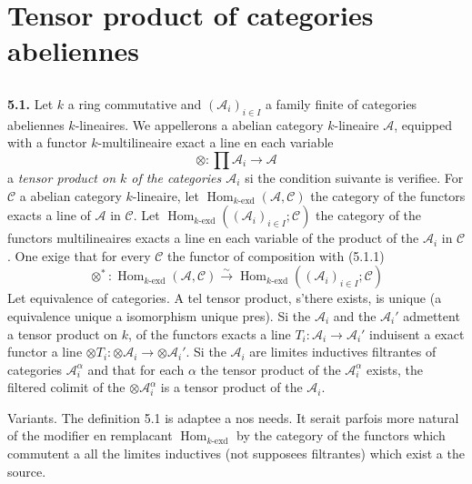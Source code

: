 \documentclass[12pt,a4paper]{article}
\theoremstyle{plain}
\theoremstyle{definition}
\theoremstyle{remark}
\DeclareMathOperator{\Hom}{Hom}
\begin{document}
\section{Tensor product of categories abeliennes}

\subsection{}

\textbf{5.1.} Let $k$ a ring commutative and $(\mathcal{A}_i)_{i \in I}$ a family finite of categories abeliennes $k$-lineaires. We appellerons a abelian category $k$-lineaire $\mathcal{A}$, equipped with a functor $k$-multilineaire exact a line en each variable
\begin{equation}\label{eq:5.1.1}
\otimes : \prod \mathcal{A}_i \to \mathcal{A}
\end{equation}
a \emph{tensor product on $k$ of the categories $\mathcal{A}_i$} si the condition suivante is verifiee. For $\mathcal{C}$ a abelian category $k$-lineaire, let $\Hom_{k\text{-}\mathrm{exd}}(\mathcal{A}, \mathcal{C})$ the category of the functors exacts a line of $\mathcal{A}$ in $\mathcal{C}$. Let $\Hom_{k\text{-}\mathrm{exd}}((\mathcal{A}_i)_{i \in I}; \mathcal{C})$ the category of the functors multilineaires exacts a line en each variable of the product of the $\mathcal{A}_i$ in $\mathcal{C}$. One exige that for every $\mathcal{C}$ the functor of composition with (5.1.1)
\[
\otimes^* : \Hom_{k\text{-}\mathrm{exd}}(\mathcal{A}, \mathcal{C}) \xrightarrow{\sim} \Hom_{k\text{-}\mathrm{exd}}((\mathcal{A}_i)_{i \in I}; \mathcal{C})
\]
Let equivalence of categories. A tel tensor product, s'there exists, is unique (a equivalence unique a isomorphism unique pres). Si the $\mathcal{A}_i$ and the $\mathcal{A}_i'$ admettent a tensor product on $k$, of the functors exacts a line $T_i : \mathcal{A}_i \to \mathcal{A}_i'$ induisent a exact functor a line $\otimes T_i : \otimes \mathcal{A}_i \to \otimes \mathcal{A}_i'$. Si the $\mathcal{A}_i$ are limites inductives filtrantes of categories $\mathcal{A}_i^\alpha$ and that for each $\alpha$ the tensor product of the $\mathcal{A}_i^\alpha$ exists, the filtered colimit of the $\otimes \mathcal{A}_i^\alpha$ is a tensor product of the $\mathcal{A}_i$.

Variants. The definition 5.1 is adaptee a nos needs. It serait parfois more natural of the modifier en remplacant $\Hom_{k\text{-}\mathrm{exd}}$ by the category of the functors which commutent a all the limites inductives (not supposees filtrantes) which exist a the source.
\end{document}
